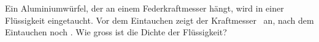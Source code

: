 Ein Aluminiumwürfel, der an einem Federkraftmesser hängt, wird in einer Flüssigkeit eingetaucht. Vor dem Eintauchen zeigt der Kraftmesser \FGO\ an, nach dem Eintauchen noch \FTO. Wie gross ist die Dichte der Flüssigkeit?
